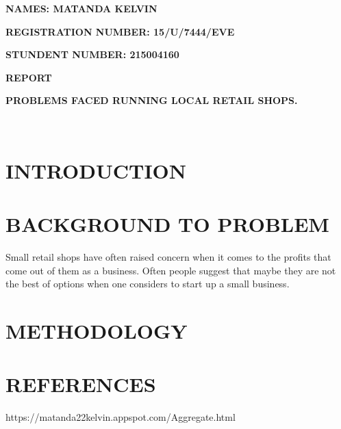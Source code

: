 \documentclass[11pt]{article}
\begin{document}
\textbf{NAMES: MATANDA KELVIN}


\textbf{REGISTRATION NUMBER: 15/U/7444/EVE}


\textbf{STUNDENT NUMBER: 215004160}


\textbf{REPORT}\\



\begin{large}\textbf{PROBLEMS FACED RUNNING LOCAL RETAIL SHOPS.}\end{large}\\

\section{INTRODUCTION}

\section{ BACKGROUND TO PROBLEM}
Small retail shops have often raised concern when it comes to the profits that come out of them as a business.
 Often people suggest that maybe they are not the best of options when one considers to start up a small business.



\section{METHODOLOGY}

\section{REFERENCES}
https://matanda22kelvin.appspot.com/Aggregate.html
\end{document}
